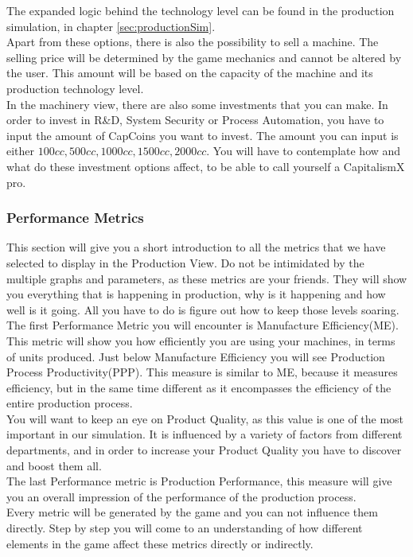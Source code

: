  The expanded logic behind the technology level can be found in the production simulation, in chapter \ref{sec:productionSim}.\\
Apart from these options, there is also the possibility to sell a machine. The selling price will be determined by the game mechanics and cannot be altered by the user. This amount will be based on the capacity of the machine and its production technology level.\\
In the machinery view, there are also some investments that you can make. In order to invest in R\&D, System Security or Process Automation, you have to input the amount of CapCoins you want to invest. The amount you can input is either $100cc,500cc,1000cc,1500cc,2000cc$. You will have to contemplate how and what do these investment options affect, to be able to call yourself a CapitalismX pro.\\

\subsubsection{Performance Metrics}
This section will give you a short introduction to all the metrics that we have selected to display in the Production View. Do not be intimidated by the multiple graphs and parameters, as these metrics are your friends. They will show you everything that is happening in production, why is it happening and how well is it going. All you have to do is figure out how to keep those levels soaring. \\
The first Performance Metric you will encounter is Manufacture Efficiency(ME). This metric will show you how efficiently you are using your machines, in terms of units produced.
Just below Manufacture Efficiency you will see Production Process Productivity(PPP). This measure is similar to ME, because it measures efficiency, but in the same time different as it encompasses the efficiency of the entire production process. \\
You will want to keep an eye on Product Quality, as this value is one of the most important in our simulation. It is influenced by a variety of factors from different departments, and in order to increase your Product Quality you have to discover and  boost them all.\\
The last Performance metric is Production Performance, this measure will give you an overall impression of the performance of the production process.\\
Every metric will be generated by the game and you can not influence them directly. Step by step you will come to an understanding of how different elements in the game affect these metrics directly or indirectly.

